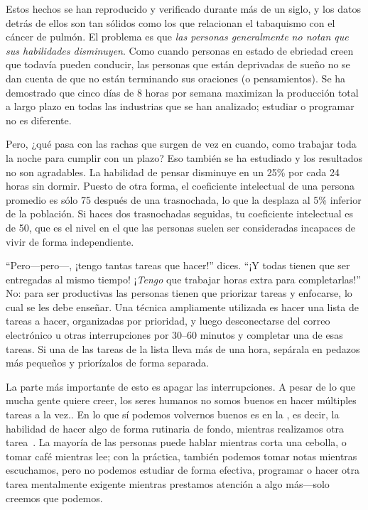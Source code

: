 Estos hechos se han reproducido y verificado durante más de un siglo,
y los datos detrás de ellos son tan sólidos como los que relacionan el tabaquismo con el cáncer de pulmón.
El problema es que
\emph{las personas generalmente no notan que sus habilidades disminuyen}.
Como cuando personas en estado de ebriedad creen que todavía pueden conducir,
las personas que están deprivadas de sueño no se dan cuenta de que
no están terminando sus oraciones (o pensamientos).
Se ha demostrado que cinco días de 8 horas por semana maximizan la producción total a largo plazo
en todas las industrias que se han analizado;
estudiar o programar no es diferente.

Pero, ¿qué pasa con las rachas que surgen de vez en cuando,
como trabajar toda la noche para cumplir con un plazo?
Eso también se ha estudiado
y los resultados no son agradables.
La habilidad de pensar disminuye en un 25\% por cada 24 horas sin dormir.
Puesto de otra forma,
el coeficiente intelectual de una persona promedio es sólo 75 después de una trasnochada,
lo que la desplaza al 5\% inferior de la población.
Si haces dos trasnochadas seguidas, tu coeficiente intelectual es de 50,
que es el nivel en el que las personas suelen ser consideradas incapaces de vivir de forma independiente.

``Pero---pero---, ¡tengo tantas tareas que hacer!'' dices.
``¡Y todas tienen que ser entregadas al mismo tiempo!
¡\emph{Tengo} que trabajar horas extra para completarlas!''
No:
para ser productivas las personas tienen que priorizar tareas y enfocarse,
lo cual se les debe enseñar.
Una técnica ampliamente utilizada es hacer una lista de tareas a hacer,
organizadas por prioridad,
y luego desconectarse del correo electrónico u otras interrupciones por 30--60 minutos
y completar una de esas tareas.
Si una de las tareas de la lista lleva más de una hora,
sepárala en pedazos más pequeños y priorízalos de forma separada.

La parte más importante de esto es apagar las interrupciones.
A pesar de lo que mucha gente quiere creer,
los seres humanos no somos buenos en hacer múltiples tareas a la vez..
En lo que sí podemos volvernos buenos es en la , es decir, 
la habilidad de hacer algo de forma rutinaria de fondo,
mientras realizamos otra tarea~\cite{Mill2016a}.
La mayoría de las personas puede hablar mientras corta una cebolla,
o tomar café mientras lee;
con la práctica,
también podemos tomar notas mientras escuchamos,
pero no podemos estudiar de forma efectiva,
programar
o hacer otra tarea mentalmente exigente mientras prestamos atención a algo más---solo
creemos que podemos.

